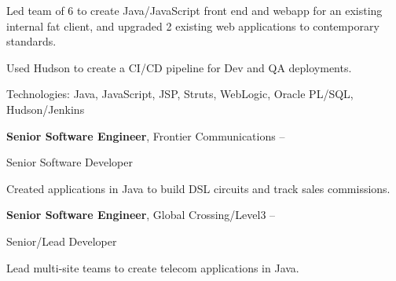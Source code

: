 \documentclass[MMMMyyyy,nonstopmode]{simpleresumecv_stacked}
\newcommand{\tech}[1]{\Gap\textrm{Technologies:} #1}
\newcommand{\comment}[1]{\ignorespaces} %
\newif\ifLOCATION
\newif\ifLONG
\begin{document}
\begin{Body}
\ifLONG

\Entry
\href{http://www.paychex.com/}
{\textbf{Paychex}}
\hfill 
\DatestampY{2005} -- \DatestampY{2010}

Lead Developer
\ifLOCATION
\hfill
Rochester, New York
\fi

\begin{Detail}
Led team of 6 to create Java/JavaScript front end and webapp for an existing internal fat client, and upgraded 2 existing web applications to contemporary standards. 

Used Hudson to create a CI/CD pipeline for Dev and QA deployments.

\iffalse
\BulletItem
Member of architecture team to research and set five-year strategy for web application strategy.
\fi

\tech{Java, JavaScript, JSP, Struts, WebLogic, Oracle PL/SQL, Hudson/Jenkins}
\end{Detail}
\fi %

\Entry
\textbf{Senior Software Engineer}, Frontier Communications
\hfill 
 -- 

Senior Software Developer
\ifLOCATION
\hfill
Rochester, New York
\fi

\begin{Detail}
Created applications in Java to build DSL circuits and track sales commissions.


\end{Detail}

\Entry
\textbf{Senior Software Engineer}, Global Crossing/Level3
\hfill 
 -- 

Senior/Lead Developer
\ifLOCATION
\hfill
Rochester, New York
\fi

\begin{Detail}
Lead multi-site teams to create telecom applications in Java.


\end{Detail}
\end{Body}
\end{document}
